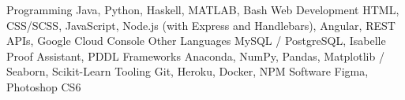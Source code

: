 \begin{cvskills}
  \cvskill
    {Programming} %
    {Java, Python, Haskell, MATLAB, Bash} %
  \cvskill
    {Web Development} %
    {HTML, CSS/SCSS, JavaScript, Node.js (with Express and Handlebars), Angular, REST APIs, Google Cloud Console}
  \cvskill
    {Other Languages} %
    {MySQL / PostgreSQL, Isabelle Proof Assistant, PDDL}
  \cvskill
    {Frameworks} %
    {Anaconda, NumPy, Pandas, Matplotlib / Seaborn, Scikit-Learn}
  \cvskill
    {Tooling} %
    {Git, Heroku, Docker, NPM}
  \cvskill
    {Software} %
    {Figma, Photoshop CS6}
\end{cvskills}

